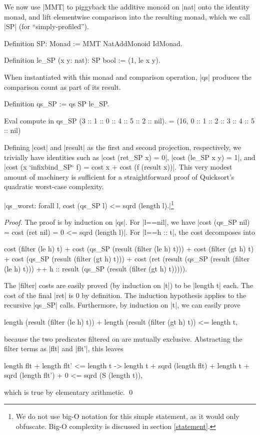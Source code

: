 \documentclass[runningheads]{llncs}
\begin{document}
We now use |MMT| to piggyback the additive monoid on |nat| onto the identity monad, and lift elementwise comparison into the resulting monad, which we call |SP| (for ``simply-profiled'').
\begin{code}
  Definition SP: Monad := MMT NatAddMonoid IdMonad.

  Definition le_SP (x y: nat): SP bool := (1, le x y).
\end{code}
When instantiated with this monad and comparison operation, |qs| produces the comparison count as part of its result.
\begin{code}
  Definition qs_SP := qs SP le_SP.

  Eval compute in qs_SP (3 :: 1 :: 0 :: 4 :: 5 :: 2 :: nil).
    = (16, 0 :: 1 :: 2 :: 3 :: 4 :: 5 :: nil)
\end{code}
Defining |cost| and |result| as the first and second projection, respectively, we trivially have identities such as |cost (ret_SP x) = 0|, |cost (le_SP x y) = 1|, and |cost (x `infixbind_SP` f) = cost x + cost (f (result x))|. This very modest amount of machinery is sufficient for a straightforward proof of Quicksort's quadratic worst-case complexity.

\begin{propo}|qs_worst: forall l, cost (qs_SP l) <= sqrd (length l).|\footnote{We do not use big-O notation for this simple statement, as it would only obfuscate. Big-O complexity is discussed in section \ref{statement}.}
\end{propo}

\begin{proof}
  The proof is by induction on |qs|. For |l==nil|, we have {|cost (qs_SP nil) = cost (ret nil) = 0 <= sqrd (length l)|}. For |l==h :: t|, the cost decomposes into
  \begin{code}
    cost (filter (le h) t) + cost (qs_SP (result (filter (le h) t))) +
    cost (filter (gt h) t) + cost (qs_SP (result (filter (gt h) t))) +
    cost (ret (result (qs_SP (result (filter (le h) t))) ++
     h :: result (qs_SP (result (filter (gt h) t))))).
  \end{code}
  The |filter| costs are easily proved (by induction on |t|) to be |length t| each. The cost of the final |ret| is 0 by definition. The induction hypothesis applies to the recursive |qs_SP| calls. Furthermore, by induction on |t|, we can easily prove
  \begin{code}
  length (result (filter (le h) t)) + length (result (filter (gt h) t)) <= length t,
  \end{code}
  because the two predicates filtered on are mutually exclusive. Abstracting the filter terms as |flt| and |flt'|, this leaves
  \begin{code}
    length flt + length flt' <= length t ->
      length t + sqrd (length flt) + length t + sqrd (length flt') + 0 <= sqrd (S (length t)),
  \end{code}
  which is true by elementary arithmetic. \qed
\end{proof}
\end{document}
